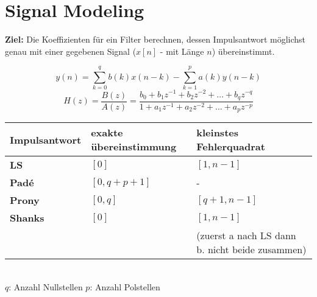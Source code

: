 \vspace{1em}
\begin{minipage}[t]{10cm}
  \vspace{-2cm}
  \section{Signal Modeling }
  \textbf{Ziel: } Die Koeffizienten für ein Filter berechnen, dessen
  Impulsantwort möglichst genau mit einer gegebenen Signal ($x[n]$ - mit
  Länge $n$) übereinstimmt.
  
      $$ y(n) = \sum\limits_{k=0}^{q} b(k)x(n-k) - \sum\limits_{k=1}^{p} a(k)y(n-k)$$
      $$ H(z) = \dfrac{B(z)}{A(z)} = \dfrac{b_0 + b_1z^{-1} + b_2 z^{-2} + \dots +
      b_q z^{-q}}{1 + a_1z^{-1} + a_2 z^{-2} + \dots + a_p z^{-p}} $$ 

\end{minipage}
\hspace{0.25cm}
\begin{minipage}{9cm}
	\begin{tabular}{| p{1.4cm} | p{2cm} | p{3.9cm} | }
	    \hline
	    \textbf{Impuls\-antwort}
	    & exakte über\-ein\-stimmung
	    & kleinstes Fehler\-quadrat \\
	    \hline
	    \hline
	    \textbf{LS} 
	    & $[0]$
	    & $[1, n - 1]$\\
	    \hline
	    \textbf{Padé} 
	    & $[0, q + p + 1]$
	    & -\\
	    \hline
	    \textbf{Prony} 
	    & $[0, q]$
	    & $[q + 1, n-1]$ \\
	    \hline
	    \textbf{Shanks} 
	    & $[0]$
	    & $[1, n - 1]$\\
	    &&(zuerst a nach LS dann b. nicht beide zusammen)\\
	    \hline
	\end{tabular}\\
	$q$: Anzahl Nullstellen \hspace{1cm} $p$: Anzahl Polstellen
\end{minipage}

